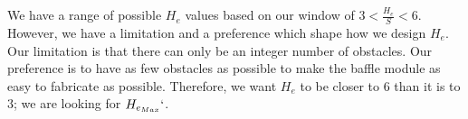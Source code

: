 \documentclass[letterpaper,10pt,english]{sphinxmanual}
\begin{document}
\section{}
\label{\detokenize{Flocculation/Floc_Design:height-between-expansions-math-h-e-and-number-of-obstacles-per-baffle-space-math-n-obstacles}}
We have a range of possible \(H_e\) values based on our window of \(3 < \frac{H_e}{S} < 6\). However, we have a limitation and a preference which shape how we design \(H_e\). Our limitation is that there can only be an integer number of obstacles. Our preference is to have as few obstacles as possible to make the baffle module as easy to fabricate as possible. Therefore, we want \(H_e\) to be closer to \(6\) than it is to \(3\); we are looking for \(H_{e_{Max}}`\).
\end{document}

